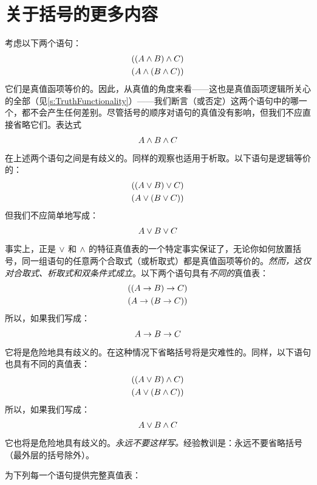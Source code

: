 \section{关于括号的更多内容}\label{s:MoreBracketingConventions}
考虑以下两个语句：
	\begin{align*}
		((A \wedge B) \wedge C)\\
		(A \wedge (B \wedge C))
	\end{align*}
它们是真值函项等价的。因此，从真值的角度来看——这也是真值函项逻辑所关心的全部（见\cref{s:TruthFunctionality}）——我们断言（或否定）这两个语句中的哪一个，都不会产生任何差别。尽管括号的顺序对语句的真值没有影响，但我们不应直接省略它们。表达式
	\begin{align*}
		A \wedge B \wedge C
	\end{align*}
在上述两个语句之间是有歧义的。同样的观察也适用于析取。以下语句是逻辑等价的：
	\begin{align*}
		((A \vee B) \vee C)\\
		(A \vee (B \vee C))
	\end{align*}
但我们不应简单地写成：
	\begin{align*}
		A \vee B \vee C
	\end{align*}
事实上，正是 $\vee$ 和 $\wedge$ 的特征真值表的一个特定事实保证了，无论你如何放置括号，同一组语句的任意两个合取式（或析取式）都是真值函项等价的。\emph{然而，这仅对合取式、析取式和双条件式成立}。以下两个语句具有\emph{不同的}真值表：
	\begin{align*}
		((A \rightarrow B) \rightarrow C)\\
		(A \rightarrow (B \rightarrow C))
	\end{align*}
所以，如果我们写成：
	\begin{align*}
		A \rightarrow B \rightarrow C
	\end{align*}
它将是危险地具有歧义的。在这种情况下省略括号将是灾难性的。同样，以下语句也具有不同的真值表：
	\begin{align*}
		((A \vee B) \wedge C)\\
		(A \vee (B \wedge C))
	\end{align*}
所以，如果我们写成：
	\begin{align*}
		A \vee B \wedge C
	\end{align*}
它也将是危险地具有歧义的。\emph{永远不要这样写。}经验教训是：永远不要省略括号（最外层的括号除外）。

\practiceproblems\label{pr.TT.TTorC}
\problempart
为下列每一个语句提供完整真值表：


